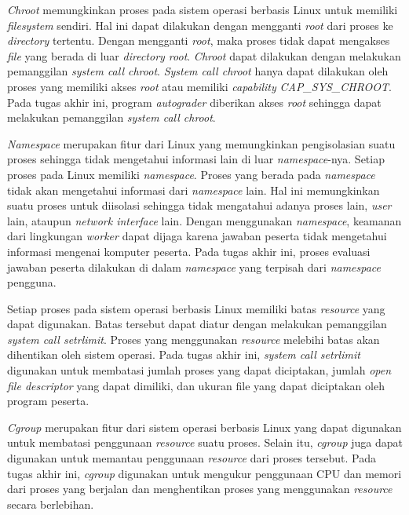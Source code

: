 \par \textit{Chroot} memungkinkan proses pada sistem operasi berbasis Linux untuk memiliki \textit{filesystem} sendiri. Hal ini dapat dilakukan dengan mengganti \textit{root} dari proses ke \textit{directory} tertentu. Dengan mengganti \textit{root}, maka proses tidak dapat mengakses \textit{file} yang berada di luar \textit{directory root}. \textit{Chroot} dapat dilakukan dengan melakukan pemanggilan \textit{system call chroot}. \textit{System call chroot} hanya dapat dilakukan oleh proses yang memiliki akses \textit{root} atau memiliki \textit{capability} \textit{CAP\_SYS\_CHROOT}. Pada tugas akhir ini, program \textit{autograder} diberikan akses \textit{root} sehingga dapat melakukan pemanggilan \textit{system call chroot}.

\par \textit{Namespace} merupakan fitur dari Linux yang memungkinkan pengisolasian suatu proses sehingga tidak mengetahui informasi lain di luar \textit{namespace}-nya. Setiap proses pada Linux memiliki \textit{namespace}. Proses yang berada pada \textit{namespace} tidak akan mengetahui informasi dari \textit{namespace} lain. Hal ini memungkinkan suatu proses untuk diisolasi sehingga tidak mengatahui adanya proses lain, \textit{user} lain, ataupun \textit{network interface} lain. Dengan menggunakan \textit{namespace}, keamanan dari lingkungan \textit{worker} dapat dijaga karena jawaban peserta tidak mengetahui informasi mengenai komputer peserta. Pada tugas akhir ini, proses evaluasi jawaban peserta dilakukan di dalam \textit{namespace} yang terpisah dari \textit{namespace} pengguna.

\par Setiap proses pada sistem operasi berbasis Linux memiliki batas \textit{resource} yang dapat digunakan. Batas tersebut dapat diatur dengan melakukan pemanggilan \textit{system call setrlimit}. Proses yang menggunakan \textit{resource} melebihi batas akan dihentikan oleh sistem operasi. Pada tugas akhir ini, \textit{system call setrlimit} digunakan untuk membatasi jumlah proses yang dapat diciptakan, jumlah \textit{open file descriptor} yang dapat dimiliki, dan ukuran file yang dapat diciptakan oleh program peserta.

\par \textit{Cgroup} merupakan fitur dari sistem operasi berbasis Linux yang dapat digunakan untuk membatasi penggunaan \textit{resource} suatu proses. Selain itu, \textit{cgroup} juga dapat digunakan untuk memantau penggunaan \textit{resource} dari proses tersebut. Pada tugas akhir ini, \textit{cgroup} digunakan untuk mengukur penggunaan CPU dan memori dari proses yang berjalan dan menghentikan proses yang menggunakan \textit{resource} secara berlebihan.

